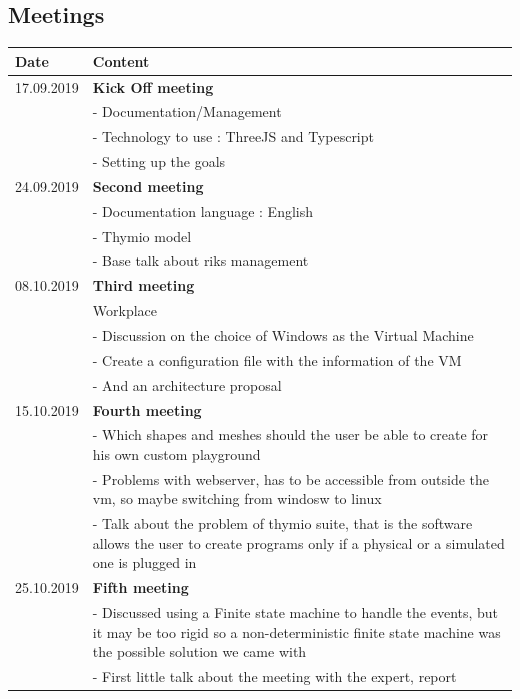 \documentclass{scrartcl}
\begin{document}
\subsection{Meetings}
\begin{tabular}{ | m{3cm} | m{10cm} | }
  \hline
  Date & Content \\
  \hline
  17.09.2019 & \textbf{Kick Off meeting}\\
  & - Documentation/Management\\
  & - Technology to use : ThreeJS and Typescript\\
  & - Setting up the goals\\
  \hline
  24.09.2019 & \textbf{Second meeting} \\
  & - Documentation language : English \\
  & - Thymio model \\
  & - Base talk about riks management \\
  \hline
  08.10.2019 & \textbf{Third meeting}\\
  & Workplace\\
  & - Discussion on the choice of Windows as the Virtual Machine \\
  & - Create a configuration file with the information of the VM \\
  & - And an architecture proposal \\
  \hline
  15.10.2019 & \textbf{Fourth meeting} \\
  & - Which shapes and meshes should the user be able to create for his own custom playground \\
  & - Problems with webserver, has to be accessible from outside the vm, so maybe switching from windosw to linux \\
  & - Talk about the problem of thymio suite, that is the software allows the user to create programs only if a physical or a simulated one is plugged in \\
  \hline
  25.10.2019 & \textbf{Fifth meeting} \\
  & - Discussed using a Finite state machine to handle the events, but it may be too rigid so a non-deterministic finite state machine was the possible solution we came with \\
  & - First little talk about the meeting with the expert, report\\
  \hline
\end{tabular}

\listoffigures

\listoftables
\end{document}
